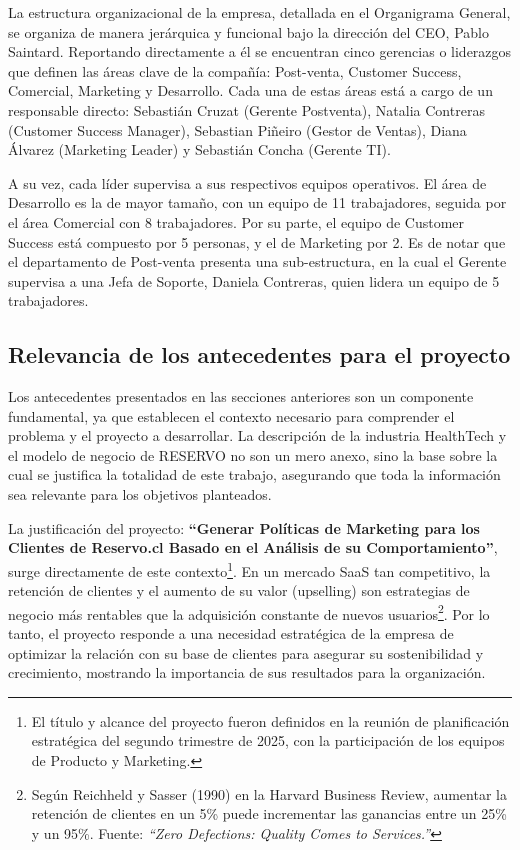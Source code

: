 La estructura organizacional de la empresa, detallada en el Organigrama General, se organiza de manera jerárquica y funcional bajo la dirección del CEO, Pablo Saintard. Reportando directamente a él se encuentran cinco gerencias o liderazgos que definen las áreas clave de la compañía: Post-venta, Customer Success, Comercial, Marketing y Desarrollo. Cada una de estas áreas está a cargo de un responsable directo: Sebastián Cruzat (Gerente Postventa), Natalia Contreras (Customer Success Manager), Sebastian Piñeiro (Gestor de Ventas), Diana Álvarez (Marketing Leader) y Sebastián Concha (Gerente TI).

A su vez, cada líder supervisa a sus respectivos equipos operativos. El área de Desarrollo es la de mayor tamaño, con un equipo de 11 trabajadores, seguida por el área Comercial con 8 trabajadores. Por su parte, el equipo de Customer Success está compuesto por 5 personas, y el de Marketing por 2. Es de notar que el departamento de Post-venta presenta una sub-estructura, en la cual el Gerente supervisa a una Jefa de Soporte, Daniela Contreras, quien lidera un equipo de 5 trabajadores.


\subsection{Relevancia de los antecedentes para el proyecto}

Los antecedentes presentados en las secciones anteriores son un componente fundamental, ya que establecen el contexto necesario para comprender el problema y el proyecto a desarrollar. La descripción de la industria HealthTech y el modelo de negocio de RESERVO no son un mero anexo, sino la base sobre la cual se justifica la totalidad de este trabajo, asegurando que toda la información sea relevante para los objetivos planteados.

La justificación del proyecto: \textbf{“Generar Políticas de Marketing para los Clientes de Reservo.cl Basado en el Análisis de su Comportamiento”}, surge directamente de este contexto\footnote{El título y alcance del proyecto fueron definidos en la reunión de planificación estratégica del segundo trimestre de 2025, con la participación de los equipos de Producto y Marketing.}. En un mercado SaaS tan competitivo, la retención de clientes y el aumento de su valor (upselling) son estrategias de negocio más rentables que la adquisición constante de nuevos usuarios\footnote{Según Reichheld y Sasser (1990) en la Harvard Business Review, aumentar la retención de clientes en un 5\% puede incrementar las ganancias entre un 25\% y un 95\%. Fuente: \textit{“Zero Defections: Quality Comes to Services.”}}. Por lo tanto, el proyecto responde a una necesidad estratégica de la empresa de optimizar la relación con su base de clientes para asegurar su sostenibilidad y crecimiento, mostrando la importancia de sus resultados para la organización.

